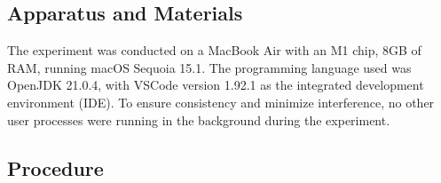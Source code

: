 \documentclass[unicode,11pt,a4paper,oneside,numbers=endperiod,openany]{scrartcl}
\begin{document}
    \subsection{Apparatus and Materials}

    The experiment was conducted on a MacBook Air with an M1 chip, 8GB of RAM, running macOS Sequoia 15.1. The programming language used was OpenJDK 21.0.4, with VSCode version 1.92.1 as the integrated development environment (IDE). To ensure consistency and minimize interference, no other user processes were running in the background during the experiment.

    \subsection{Procedure}
\end{document}
